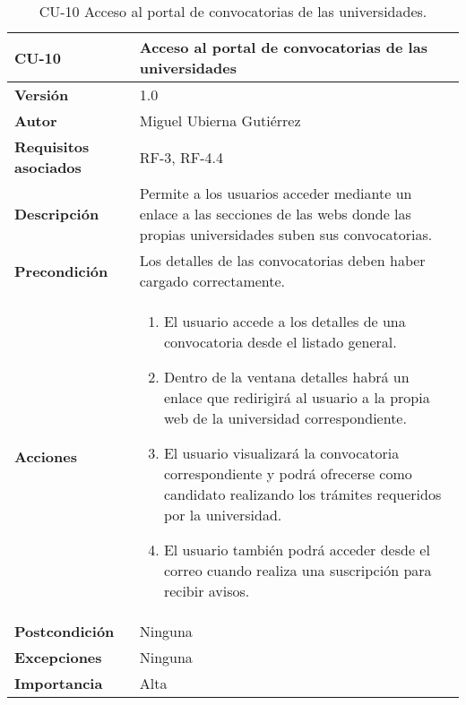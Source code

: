 \begin{table}[p]
	\centering
	\begin{tabularx}{\linewidth}{ p{} p{} }
		\toprule
		\textbf{CU-10}    & \textbf{Acceso al portal de convocatorias de las universidades}\\
		\toprule
		\textbf{Versión}              & 1.0    \\
		\textbf{Autor}                & Miguel Ubierna Gutiérrez \\
		\textbf{Requisitos asociados} & RF-3, RF-4.4 \\
		\textbf{Descripción}          & Permite a los usuarios acceder mediante un enlace a las secciones de las webs donde las propias universidades suben sus convocatorias.  \\
		\textbf{Precondición}         & Los detalles de las convocatorias deben haber cargado correctamente.\\
		\textbf{Acciones}             &
		\begin{enumerate}
			\def\labelenumi{\arabic{enumi}.}
			\tightlist
			\item El usuario accede a los detalles de una convocatoria desde el listado general.
                \item Dentro de la ventana detalles habrá un enlace que redirigirá al usuario a la propia web de la universidad correspondiente.
                \item El usuario visualizará la convocatoria correspondiente y podrá ofrecerse como candidato realizando los trámites requeridos por la universidad.
                \item El usuario también podrá acceder desde el correo cuando realiza una suscripción para recibir avisos.                
		\end{enumerate}\\
		\textbf{Postcondición}        & Ninguna \\
		\textbf{Excepciones}          & Ninguna  \\
		\textbf{Importancia}          & Alta  \\
		\bottomrule
	\end{tabularx}
	\caption{CU-10 Acceso al portal de convocatorias de las universidades.}
\end{table}


